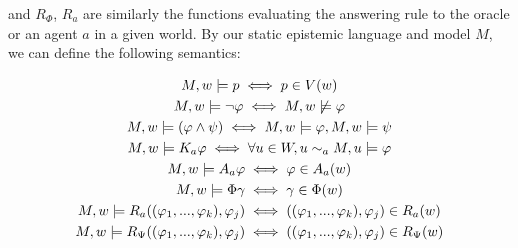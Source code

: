 and $R_{\Phi}$, $R_{a}$ are similarly the functions evaluating the answering rule to the oracle or an agent $a$ in a given world. By our static epistemic language \staticlang and model $M$, we can define the following semantics:

\begin{gather*}
	M, w |= p \iff p \in V(w) \\
	M, w |= \neg\varphi \iff M, w \not\models \varphi\\
	M, w |= (\varphi \land \psi) \iff M, w |= \varphi, M, w |= \psi \\
	M, w |= K_a\varphi \iff \forall u\in W, u \sim_{a} M, u |= \varphi \\
	M, w |= A_a\varphi \iff \varphi \in A_a(w) \\
	M, w |= \Phi\gamma \iff \gamma \in \Phi(w) \\
	M, w |= R_a((\varphi_1,...,\varphi_k), \varphi_j) \iff ((\varphi_1,...,\varphi_k), \varphi_j) \in R_a(w) \\
	M, w |= R_\Psi((\varphi_1,...,\varphi_k), \varphi_j) \iff ((\varphi_1,...,\varphi_k), \varphi_j) \in R_\Psi(w)
\end{gather*}

